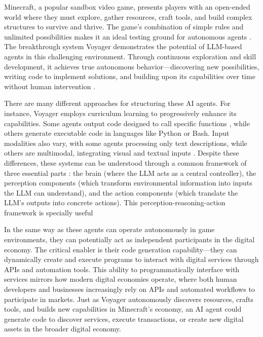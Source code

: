 \documentclass{article}
\begin{document}
Minecraft, a popular sandbox video game, presents players with an open-ended world where they must explore, gather resources, craft tools, and build complex structures to survive and thrive. The game's combination of simple rules and unlimited possibilities makes it an ideal testing ground for autonomous agents \cite{Kanervisto2020a,Kanervisto2020b,Kanervisto2020c}. The breakthrough system Voyager demonstrates the potential of LLM-based agents in this challenging environment. Through continuous exploration and skill development, it achieves true autonomous behavior—discovering new possibilities, writing code to implement solutions, and building upon its capabilities over time without human intervention \cite{Milani2023,Karttunen2019}.

There are many different approaches for structuring these AI agents. For instance, Voyager \cite{voyager} employs curriculum learning to progressively enhance its capabilities. Some agents output code designed to call specific functions \cite{claudette2024toolloop}, while others generate executable code in languages like Python or Bash\cite{voyager}. Input modalities also vary, with some agents processing only text descriptions\cite{zhu2023ghost}, while others are multimodal, integrating visual and textual inputs \cite{replit2024agent}. Despite these differences, these systems can be understood through a common framework of three essential parts \cite{ai_agents_survey}: the brain (where the LLM acts as a central controller), the perception components (which transform environmental information into inputs the LLM can understand), and the action components (which translate the LLM's outputs into concrete actions). This perception-reasoning-action framework is specially useful

In the same way as these agents can operate autonomously in game environments, they can potentially act as independent participants in the digital economy. The critical enabler is their code generation capability—they can dynamically create and execute programs to interact with digital services through APIs and automation tools. This ability to programmatically interface with services mirrors how modern digital economies operate, where both human developers and businesses increasingly rely on APIs and automated workflows to participate in markets. Just as Voyager autonomously discovers resources, crafts tools, and builds new capabilities in Minecraft's economy, an AI agent could generate code to discover services, execute transactions, or create new digital assets in the broader digital economy.
\end{document}
